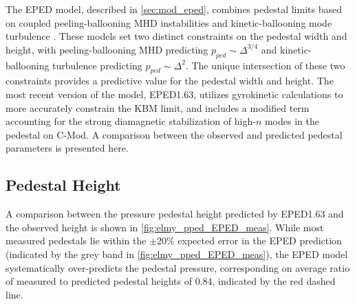 The EPED model, described in \cref{sec:mod_eped}, combines pedestal limits based on coupled peeling-ballooning MHD instabilities \cite{Snyder2004,Wilson2002,Wilson2006} and kinetic-ballooning mode turbulence \cite{Snyder2001}.  These models set two distinct constraints on the pedestal width and height, with peeling-ballooning MHD predicting $p_{ped} \sim \Delta^{3/4}$ and kinetic-ballooning turbulence predicting $p_{ped} \sim \Delta^2$.  The unique intersection of these two constraints provides a predictive value for the pedestal width and height.  The most recent version of the model, EPED1.63, utilizes gyrokinetic calculations to more accurately constrain the KBM limit, and includes a modified term accounting for the strong diamagnetic stabilization of high-$n$ modes in the pedestal on C-Mod.  A comparison between the observed and predicted pedestal parameters is presented here.

\subsection{Pedestal Height}\label{subsec:elmy_eped_height}

A comparison between the pressure pedestal height predicted by EPED1.63 and the observed height is shown in \cref{fig:elmy_pped_EPED_meas}.  While most measured pedestals lie within the $\pm 20\%$ expected error in the EPED prediction (indicated by the grey band in \cref{fig:elmy_pped_EPED_meas}), the EPED model systematically over-predicts the pedestal pressure, corresponding on average ratio of measured to predicted pedestal heights of $0.84$, indicated by the red dashed line.

\begin{figure}[h]
 \pushtooutside
\end{figure}

